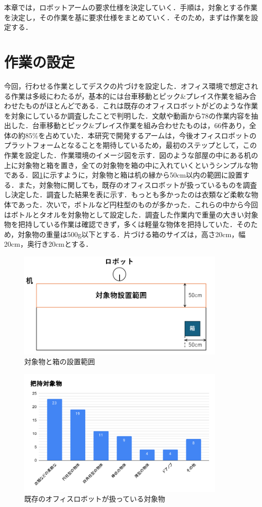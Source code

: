 本章では，ロボットアームの要求仕様を決定していく．手順は，対象とする作業を決定し，その作業を基に要求仕様をまとめていく．そのため，まずは作業を設定する．
\section{作業の設定}
今回，行わせる作業としてデスクの片づけを設定した．オフィス環境で想定される作業は多岐にわたるが，基本的には台車移動とピック\&プレイス作業を組み合わせたものがほとんどである．これは既存のオフィスロボットがどのような作業を対象にしているか調査したことで判明した．文献や動画から78の作業内容を抽出した．台車移動とピック\&プレイス作業を組み合わせたものは，66件あり，全体の約85\%を占めていた．本研究で開発するアームは，今後オフィスロボットのプラットフォームとなることを期待しているため，最初のステップとして，この作業を設定した．作業環境のイメージ図を示す．図のような部屋の中にある机の上に対象物と箱を置き，全ての対象物を箱の中に入れていくというシンプルな物である．図\ref{fig:range}に示すように，対象物と箱は机の縁から50cm以内の範囲に設置する．また，対象物に関しても，既存のオフィスロボットが扱っているものを調査し決定した．調査した結果を表に示す．もっとも多かったのは衣類など柔軟な物体であった．次いで，ボトルなど円柱型のものが多かった．これらの中から今回はボトルとタオルを対象物として設定した．調査した作業内で重量の大きい対象物を把持している作業は確認できず，多くは軽量な物体を把持していた．そのため，対象物の重量は500g以下とする．片づける箱のサイズは，高さ20cm，幅20cm，奥行き20cmとする．
\begin{figure}[h]
  \centering
  \includegraphics[width=10cm]{images/range.png}
  \caption{対象物と箱の設置範囲}
  \label{fig:range}
\end{figure}
\begin{figure}[h]
  \centering
  \includegraphics[width=10cm]{images/handget.pdf}
  \caption{既存のオフィスロボットが扱っている対象物}
  \label{fig:handget}
\end{figure}
\newpage